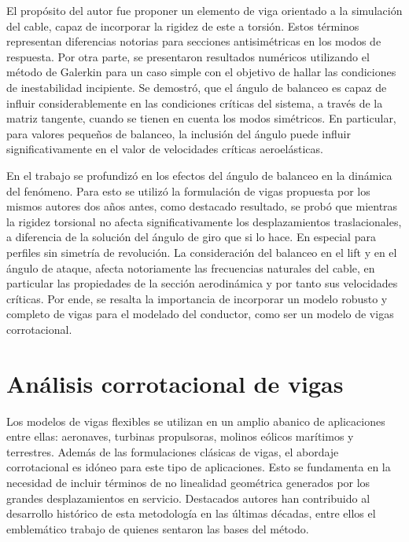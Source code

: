 El propósito del autor \cite{luongo2007linear} fue proponer un elemento de viga orientado a la simulación del cable, capaz de incorporar la rigidez de este a torsión. Estos términos representan diferencias notorias para secciones antisimétricas en los modos de respuesta. Por otra parte, se presentaron resultados numéricos utilizando el método de Galerkin para un caso simple con el objetivo de hallar las condiciones de inestabilidad incipiente. Se demostró, que el ángulo de balanceo es capaz de influir considerablemente en las condiciones críticas del sistema, a través de la matriz tangente, cuando se tienen en cuenta los modos simétricos. En particular, para valores pequeños de balanceo, la inclusión del ángulo puede influir significativamente en el valor de velocidades críticas aeroelásticas.

En el trabajo \citep{luongo2009effect} se profundizó en los efectos del ángulo de balanceo en la dinámica del fenómeno. Para esto se utilizó la formulación de vigas propuesta por los mismos autores dos años antes, como destacado resultado, se probó que mientras la rigidez torsional no afecta significativamente los desplazamientos traslacionales, a diferencia de la solución del ángulo de giro que si lo hace. En especial para perfiles sin simetría de revolución. La consideración del balanceo en el lift y en el ángulo de ataque, afecta notoriamente las frecuencias naturales del cable, en particular las propiedades de la sección aerodinámica y por tanto sus velocidades críticas. Por ende, se resalta la importancia de incorporar un modelo robusto y completo de vigas para el modelado del conductor, como ser un modelo de vigas corrotacional.



\section{Análisis corrotacional de vigas}\label{Sec:EA:Corrotacional}
Los modelos de vigas flexibles se utilizan en un amplio abanico de aplicaciones entre ellas: aeronaves, turbinas propulsoras, molinos eólicos marítimos y terrestres. Además de las formulaciones clásicas de vigas, el abordaje corrotacional es idóneo para este tipo de aplicaciones. Esto se fundamenta en la necesidad de incluir términos de no linealidad geométrica generados por los grandes desplazamientos en servicio. Destacados autores han contribuido al desarrollo histórico de esta metodología en las últimas décadas, entre ellos el emblemático trabajo de \cite{Nour-Omid1991} quienes sentaron las bases del método. 


